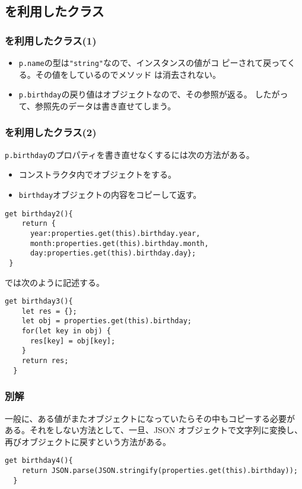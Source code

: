 \subsection{を利用したクラス}
\begin{frame}
 \frametitle{を利用したクラス(1)}
 \begin{itemize}
	\item \texttt{p.name}の型は\Verb+"string"+なので、インスタンスの値がコ
				ピーされて戻ってくる。その値をしているのでメソッド
				は消去されない。
	\item \texttt{p.birthday}の戻り値はオブジェクトなので、その参照が返る。
				したがって、参照先のデータは書き直せてしまう。
 \end{itemize}
\end{frame}

\begin{frame}[containsverbatim]
 \frametitle{を利用したクラス(2)}
 \texttt{p.birthday}のプロパティを書き直せなくするには次の方法がある。
 \begin{itemize}
	\item コンストラクタ内でオブジェクトをする。
	\item \texttt{birthday}オブジェクトの内容をコピーして返す。
\end{itemize}
\begin{Verbatim}[fontsize=\scriptsize]
  get birthday2(){
    return {
      year:properties.get(this).birthday.year,
      month:properties.get(this).birthday.month,
      day:properties.get(this).birthday.day};
 }
\end{Verbatim}
では次のように記述する。
\begin{Verbatim}[fontsize=\scriptsize]
  get birthday3(){
    let res = {};
    let obj = properties.get(this).birthday;
    for(let key in obj) {
      res[key] = obj[key];
    }
    return res;
  }
\end{Verbatim}
\end{frame}
 \begin{frame}[containsverbatim]
  \frametitle{別解}
  一般に、ある値がまたオブジェクトになっていたらその中もコピーする必要が
  ある。それをしない方法として、一旦、JSON オブジェクトで文字列に変換し、
  再びオブジェクトに戻すという方法がある。
\begin{Verbatim}[fontsize=\small]
  get birthday4(){
    return JSON.parse(JSON.stringify(properties.get(this).birthday));
  }
\end{Verbatim}
 \end{frame}
